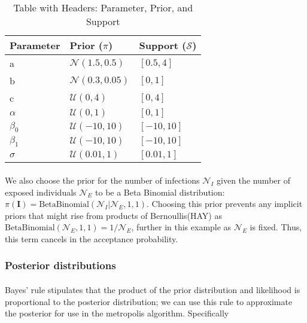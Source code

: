 \documentclass{article}
\begin{document}
\begin{table}[ht]
    \centering
    \begin{tabular}{|l|l|l|}
        \hline
        \textbf{Parameter} & \textbf{Prior ($\pi$)} & \textbf{Support ($\mathcal{S}$)} \\
        \hline
        a & $\mathcal{N}(1.5, 0.5)$ & $[0.5, 4]$ \\
        \hline
        b & $\mathcal{N}(0.3, 0.05)$ & $[0, 1]$ \\
        \hline
        c & $\mathcal{U}(0, 4)$ & $[0, 4]$ \\
        \hline
        $\alpha$ & $\mathcal{U}(0, 1)$ & $[0, 1]$ \\
        \hline
        $\beta_0$ & $\mathcal{U}(-10, 10)$ & $[-10, 10]$ \\
        \hline
        $\beta_1$ & $\mathcal{U}(-10, 10)$ & $[-10, 10]$ \\
        \hline
        $\sigma$ &  $\mathcal{U}(0.01, 1)$ & $[0.01, 1]$ \\
        \hline
    \end{tabular}
    \caption{Table with Headers: Parameter, Prior, and Support}
    \label{tab:mytable}
\end{table}

\paragraph{}We also choose the prior for the number of infections $\mathcal{N}_I$ given the number of exposed individuals $\mathcal{N}_E$ to be a Beta Binomial distribution: $\pi(\mathbf{I}) = \text{BetaBinomial}(\mathcal{N}_I | \mathcal{N}_E, 1, 1)$. Choosing this prior prevents any implicit priors that might rise from products of Bernoullis(HAY) as $\text{BetaBinomial}(\mathcal{N}_E, 1, 1) = 1 / \mathcal{N}_E$, further in this example as $\mathcal{N}_E$ is fixed. Thus, this term cancels in the acceptance probability. 


\subsubsection{Posterior distributions}

\paragraph{}Bayes' rule stipulates that the product of the prior distribution and likelihood is proportional to the posterior distribution; we can use this rule to approximate the posterior for use in the metropolis algorithm. Specifically 
\end{document}
